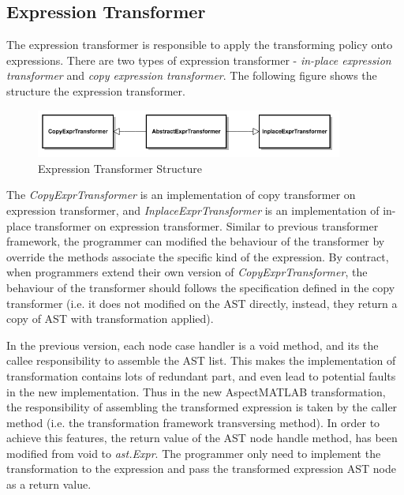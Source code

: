 \documentclass{comp621}
\begin{document}
\subsection{Expression Transformer} 
The expression transformer is responsible to apply the transforming policy onto
expressions. There are two types of expression transformer - \emph{in-place
expression transformer} and \emph{copy expression transformer}. The following
figure shows the structure the expression transformer.

\begin{figure}[!htbp]
    \begin{center}
    \includegraphics[width=0.9\textwidth]
                    {figures/expression_transformer_structure}
    \end{center}
    \caption{Expression Transformer Structure}
\end{figure}

The \emph{CopyExprTransformer} is an implementation of copy transformer on
expression transformer, and \emph{InplaceExprTransformer} is an implementation
of in-place transformer on expression transformer. Similar to previous
transformer framework, the programmer can modified the behaviour of the
transformer by override the methods associate the specific kind of the
expression. By contract, when programmers extend their own version of
\emph{CopyExprTransformer}, the behaviour of the transformer should follows the
specification defined in the copy transformer (i.e. it does not modified on the
AST directly, instead, they return a copy of AST with transformation applied).

In the previous version, each node case handler is a void method, and its the
callee responsibility to assemble the AST list. This makes the implementation
of transformation contains lots of redundant part, and even lead to potential
faults in the new implementation. Thus in the new AspectMATLAB transformation,
the responsibility of assembling the transformed expression is taken by the
caller method (i.e. the transformation framework transversing method). In order
to achieve this features, the return value of the AST node handle method, has
been modified from void to \emph{ast.Expr}. The programmer only need to
implement the transformation to the expression and pass the transformed
expression AST node as a return value.
\end{document}
